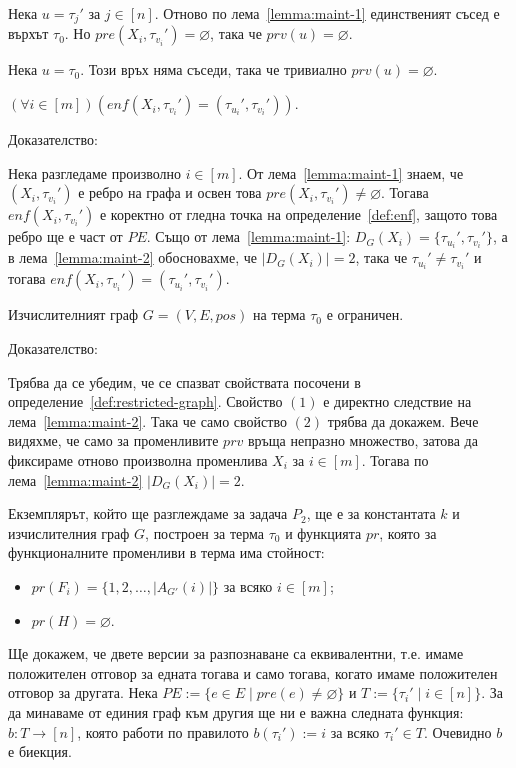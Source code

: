 \documentclass[12pt,twoside,a4paper]{article}
\begin{document}
\begin{theorem}
\begin{lemma}
			Нека $u = \tau_j'$ за $j \in [n]$. Отново по лема~\ref{lemma:maint-1} единственият съсед е върхът $\tau_0$. Но $pre(X_i,\tau_{v_i}') = \varnothing$, така че $prv(u) = \varnothing$.
			
			Нека $u = \tau_0$. Този връх няма съседи, така че тривиално $prv(u) = \varnothing$.
		\end{lemma}
		
		\begin{lemma}\label{lemma:maint-3} $(\forall i \in [m])(enf(X_i,\tau_{v_i}')=(\tau_{u_i}',\tau_{v_i}'))$.
			
			\noindent Доказателство:
			
			Нека разгледаме произволно $i \in [m]$. От лема~\ref{lemma:maint-1} знаем, че $(X_i,\tau_{v_i}')$ е ребро на графа и освен това $pre(X_i,\tau_{v_i}') \neq \varnothing$. Тогава $enf(X_i,\tau_{v_i}')$ е коректно от гледна точка на определение~\ref{def:enf}, защото това ребро ще е част от $PE$. Също от лема~\ref{lemma:maint-1}: $D_G(X_i)=\{\tau_{u_i}',\tau_{v_i}'\}$, а в лема~\ref{lemma:maint-2} обосновахме, че $|D_G(X_i)|=2$, така че $\tau_{u_i}' \neq \tau_{v_i}'$ и тогава $enf(X_i,\tau_{v_i}')=(\tau_{u_i}',\tau_{v_i}')$.
		\end{lemma}
		
		\begin{lemma}\label{lemma:maint-4} Изчислителният граф $G=(V,E,pos)$ на терма $\tau_0$ е ограничен.
			
			\noindent Доказателство:
			
			Трябва да се убедим, че се спазват свойствата посочени в определение~\ref{def:restricted-graph}. Свойство $(1)$ е директно следствие на лема~\ref{lemma:maint-2}. Така че само свойство $(2)$ трябва да докажем. Вече видяхме, че само за променливите $prv$ връща непразно множество, затова да фиксираме отново произволна променлива $X_i$ за $i \in [m]$. Тогава по лема~\ref{lemma:maint-2} $|D_G(X_i)| = 2$.
		\end{lemma}
		
		Екземплярът, който ще разглеждаме за задача $P_2$, ще е за константата $k$ и изчислителния граф $G$, построен за терма $\tau_0$ и функцията $pr$, която за функционалните променливи в терма има стойност:
		\begin{itemize}
			\item $pr(F_i)=\{1, 2, \dots, |A_{G'}(i)|\}$ за всяко $i \in [m]$;
			\item $pr(H)=\varnothing$.
		\end{itemize}
		Ще докажем, че двете версии за разпознаване са еквивалентни, т.е. имаме положителен отговор за едната тогава и само тогава, когато имаме положителен отговор за другата. Нека $PE := \{e \in E \mid pre(e) \neq \varnothing\}$ и $T := \{\tau_i' \mid i \in [n]\}$. За да минаваме от единия граф към другия ще ни е важна следната функция: $b \colon T \to [n]$, която работи по правилото $b(\tau_i'):=i$ за всяко $\tau_i' \in T$. Очевидно $b$ е биекция.
		

\end{theorem}
\end{document}
